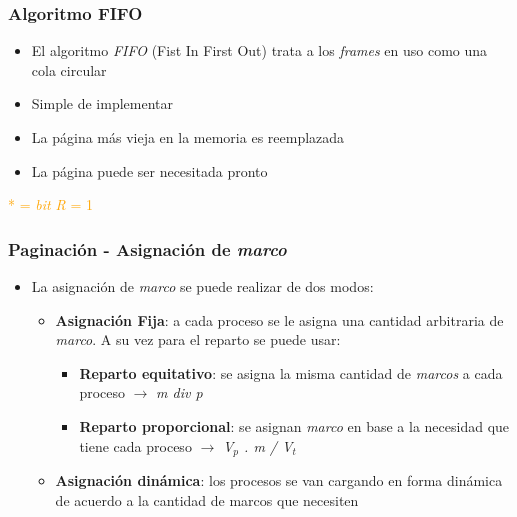 \begin{frame}
  \frametitle{Algoritmo \textbf{FIFO}}
  \begin{itemize}
  	\item El algoritmo \emph{FIFO} (Fist In First Out) trata a los \emph{frames} en uso como una cola circular
	\item Simple de implementar
	\item La página más vieja en la memoria es reemplazada
	\item La página puede ser necesitada pronto
  \end{itemize}
  \begin{table}
	  \centering
  \end{table}
  \textcolor{orange}{* = \emph{bit R} = 1}
\end{frame}

\begin{frame}
  \frametitle{Paginación - Asignación de \emph{marco}}
  \begin{itemize}
  	\item La asignación de \emph{marco} se puede realizar de dos modos:
  	\begin{itemize}
  		\item \textbf{Asignación Fija}: a cada proceso se le asigna una cantidad arbitraria de \emph{marco}. A su vez para el reparto se puede usar:
  		\begin{itemize}
  			\item \textbf{Reparto equitativo}: se asigna la misma cantidad de \emph{marcos} a cada proceso $\rightarrow$ \textit{m div p}
  			\item \textbf{Reparto proporcional}: se asignan \emph{marco} en base a la necesidad que tiene cada proceso $\rightarrow$ \textit{V$_p$ . m / V$_t$}
  		\end{itemize}
		\item \textbf{Asignación dinámica}: los procesos se van cargando en forma dinámica de acuerdo a la cantidad de marcos que necesiten		
  	\end{itemize}
  \end{itemize}
\end{frame}

